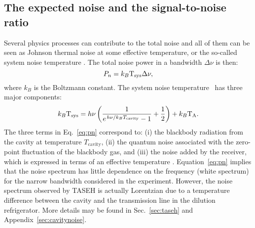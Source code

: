 \subsection{The expected noise and the signal-to-noise ratio}
\label{sec:intronoise}
Several physics processes can contribute to the total noise and all of them 
can be seen as Johnson thermal noise at some effective temperature, or the 
so-called system noise temperature \tsys. The total noise power in a 
bandwidth $\Delta\nu$ is then:
\begin{equation}
  P_n = k_B\text{T}_\text{sys}\Delta\nu, 
\end{equation}
where $k_B$ is the Boltzmann constant. 
The system noise temperature \tsys\ has three major components: 
\begin{equation}
  k_B\text{T}_\text{sys} = h\nu\left(\frac{1}{e^{\left.h\nu\right/k_{B}T_\mathrm{cavity}}-1} + \frac{1}{2} \right) + k_B\text{T}_\text{A}. 
\label{eq:pn}
\end{equation}
 The three terms in Eq.~\eqref{eq:pn} correspond to: (i) the blackbody radiation 
from the cavity at temperature $T_\mathrm{cavity}$, (ii) the quantum noise 
associated with the zero-point fluctuation of the blackbody gas, and (iii) the 
noise added by the receiver, which is expressed in terms of an effective 
temperature \ta. Equation~\eqref{eq:pn} implies 
that the noise spectrum has little dependence on the frequency 
(white spectrum) for the narrow bandwidth considered in the experiment. 
However, the noise spectrum observed by TASEH 
is actually Lorentzian due to a temperature difference between the cavity 
and the transmission line in the dilution refrigerator. More details may be 
found in Sec.~\ref{sec:taseh} and Appendix~\ref{sec:cavitynoise}. 

